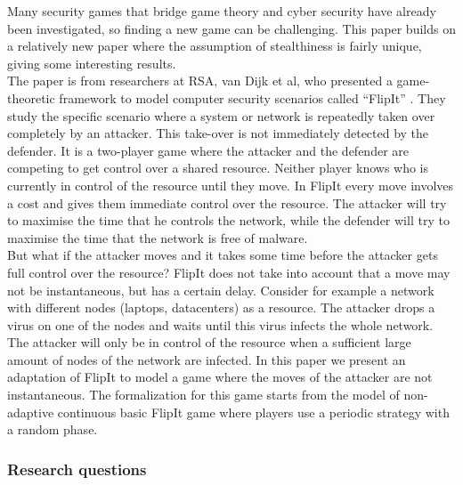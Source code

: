 Many security games that bridge game theory and cyber security have already been investigated, so finding a new game can be challenging. This paper builds on a relatively new paper where the assumption of stealthiness is fairly unique, giving some interesting results.\\ 
 The paper is from researchers at RSA, van Dijk et al,  who presented a game-theoretic framework to model computer security scenarios called ``FlipIt'' \cite{FlipIt}. They study the specific scenario where a system or network is repeatedly taken over completely by an attacker. This take-over is not immediately detected by the defender. It is a two-player game where the attacker and the defender are competing to get control over a shared resource. Neither player knows who is currently in control of the resource until they move. In FlipIt every move involves a cost and gives them immediate control over the resource. The attacker will try to maximise the time that he controls the network, while the defender will try to maximise the time that the network is free of malware. \\
 But what if the attacker moves and it takes some time before the attacker gets full control over the resource? FlipIt does not take into account that a move may not be instantaneous, but has a certain delay. Consider for example a network with different nodes (laptops, datacenters) as a resource. The attacker drops a virus on one of the nodes and waits until this virus infects the whole network. The attacker will only be in control of the resource when a sufficient large amount of nodes of the network are infected. In this paper we present an adaptation of FlipIt to model a game where the moves of the attacker are not instantaneous. The formalization for this game starts from the model of non-adaptive continuous basic FlipIt game where players use a periodic strategy with a random phase.   \\

\subsubsection{Research questions}


